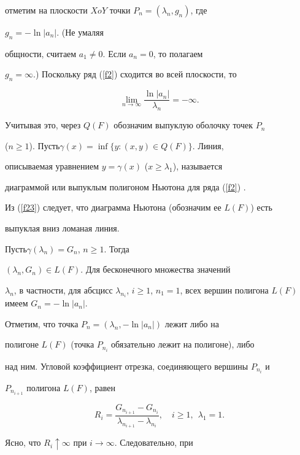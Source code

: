 отметим на плоскости $XoY$ точки $P_{n}=(\lambda_{n},g_{n})$, где


$g_{n}=-\ln|a_{n}|$. (Не умаляя


общности, считаем $a_{1}\neq 0$. Если $a_{n}=0$, то полагаем


$g_{n}=\infty$.) Поскольку ряд (\ref{f2}) сходится во всей плоскости, то


\begin{equation}\label{f23}


\lim_{n\to\infty}\frac{\ln |a_{n}|}{\lambda_{n}}=-\infty.


\end{equation}


Учитывая это, через $Q(F)$ обозначим выпуклую оболочку точек $P_{n}$


($n\geq1$). Пусть$\gamma(x)=\inf{\{y:(x,y)\in Q(F)\}}$. Линия,


описываемая уравнением $y=\gamma(x)$ ($x\geq \lambda_{1}$), называется


диаграммой или выпуклым полигоном Ньютона для ряда (\ref{f2}) \cite{lit1}.


Из (\ref{f23}) следует, что диаграмма Ньютона (обозначим ее $L(F)$) есть


выпуклая вниз ломаная линия.





Пусть$\gamma(\lambda_{n})=G_{n}$, $n\geq 1$. Тогда


$(\lambda_{n},G_{n})\in L(F)$. Для бесконечного множества значений


$\lambda_{n}$, в частности, для абсцисс $\lambda_{n_{i}}$, $i\geq


1$, $n_{1}=1$, всех вершин полигона $L(F)$ имеем $G_{n}=-\ln |a_{n}|$.


Отметим, что точка $P_{n}=(\lambda_{n},-\ln |a_{n}|)$ лежит либо на


полигоне $L(F)$ (точка $P_{n_{i}}$ обязательно лежит на полигоне), либо


над ним. Угловой коэффициент отрезка, соединяющего вершины $P_{n_{i}}$ и


$P_{n_{i+1}}$ полигона $L(F)$, равен


$$


R_{i}=\frac{G_{n_{i+1}}-G_{n_{i}}}{\lambda_{n_{i+1}}-\lambda_{n_{i}}},


\quad i\geq 1,\ \ \lambda_{1}=1.


$$


Ясно, что $R_{i}\uparrow\infty$ при $i\to\infty.$ Следовательно, при


